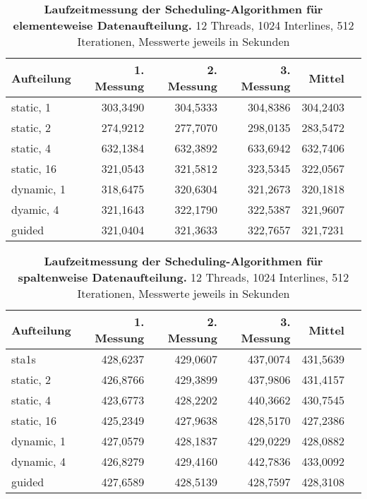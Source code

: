 \documentclass[a4paper,12pt]{scrartcl}
\begin{document}
\begin{table}[!h]
\begin{tabular}{|l|r|r|r|r|r|}
\hline
Aufteilung&1. Messung&2. Messung&3. Messung&Mittel\\
\hline
static, 1&	303,3490&	304,5333&	304,8386&	304,2403\\
\hline
static, 2	&274,9212	&277,7070	&298,0135	&283,5472\\
\hline
static, 4	&632,1384	&632,3892	&633,6942	&632,7406\\
\hline
static, 16	&321,0543	&321,5812	&323,5345	&322,0567\\
\hline
dynamic, 1	&318,6475	&320,6304	&321,2673	&320,1818\\
\hline
dyamic, 4	&321,1643	&322,1790	&322,5387	&321,9607\\
\hline
guided	&321,0404	&321,3633	&322,7657	&321,7231\\

\hline
\end{tabular}
\caption{\textbf{Laufzeitmessung der Scheduling-Algorithmen für \\elementeweise Datenaufteilung.} 12 Threads, 1024 Interlines, 512 \\Iterationen, Messwerte jeweils in Sekunden}
\end{table}

\begin{table}[!h]
\begin{tabular}{|l|r|r|r|r|r|}
\hline
Aufteilung&1. Messung&2. Messung&3. Messung&Mittel\\
\hline
sta1s	&428,6237	&429,0607	&437,0074	&431,5639\\
\hline
static, 2	&426,8766	&429,3899	&437,9806	&431,4157\\
\hline
static, 4	&423,6773	&428,2202	&440,3662	&430,7545\\
\hline
static, 16	&425,2349	&427,9638	&428,5170	&427,2386\\
\hline
dynamic, 1	&427,0579	&428,1837	&429,0229	&428,0882\\
\hline
dynamic, 4 	&426,8279	&429,4160	&442,7836	&433,0092\\
\hline
guided	&427,6589	&428,5139	&428,7597	&428,3108\\

\hline
\end{tabular}
\caption{\textbf{Laufzeitmessung der Scheduling-Algorithmen für \\spaltenweise Datenaufteilung.} 12 Threads, 1024 Interlines, 512 \\Iterationen, Messwerte jeweils in Sekunden}
\end{table}
\end{document}

